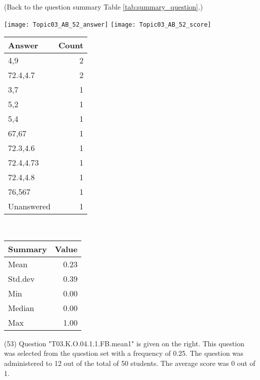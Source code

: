 \documentclass[12pt,english,nohyper]{tufte-handout}\usepackage[]{graphicx}\usepackage[]{color}
\begin{document}
 (Back to the question summary Table \ref{tab:summary_question}.)

\begin{center} \texttt{[image: Topic03\_AB\_52\_answer]} \texttt{[image: Topic03\_AB\_52\_score]} \end{center} 

\begin{center}%
\begin{tabular}{lr}
  \hline
Answer & Count \\ 
  \hline
4,9 &   2 \\ 
  72.4,4.7 &   2 \\ 
  3,7 &   1 \\ 
  5,2 &   1 \\ 
  5,4 &   1 \\ 
  67,67 &   1 \\ 
  72.3,4.6 &   1 \\ 
  72.4,4.73 &   1 \\ 
  72.4,4.8 &   1 \\ 
  76,567 &   1 \\ 
  Unanswered &   1 \\ 
   \hline
\end{tabular}
~~~~~~~~%
\begin{tabular}{lr}
  \hline
Summary & Value \\ 
  \hline
Mean & 0.23 \\ 
  Std.dev & 0.39 \\ 
  Min & 0.00 \\ 
  Median & 0.00 \\ 
  Max & 1.00 \\ 
   \hline
\end{tabular}
\end{center}\newpage{} (53) Question "T03.K.O.04.1.1.FB.mean1" is given on the right. This question was selected from the question set with a frequency of 0.25. The question was administered to 12 out of the total of 50 students. The average score was 0 out of 1.
\end{document}
